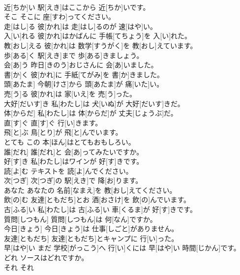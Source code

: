 \documentclass[8pt]{extreport}
\begin{document}
\begin{CJK}{UTF8}{min}
\\	近[ちか]い	駅[えき]はここから 近[ちか]いです。		
\\	そこ	そこに 座[すわ]ってください。		
\\	走[はし]る	彼[かれ]は 走[はし]るのが 速[はや]い。		
\\	入[い]れる	彼[かれ]はかばんに 手帳[てちょう]を 入[い]れた。		
\\	教[おし]える	彼[かれ]は 数学[すうがく]を 教[おし]えています。		
\\	歩[ある]く	駅[えき]まで 歩[ある]きましょう。		
\\	会[あ]う	昨日[きのう]おじさんに 会[あ]いました。		
\\	書[か]く	彼[かれ]に 手紙[てがみ]を 書[か]きました。		
\\	頭[あたま]	今朝[けさ]から 頭[あたま]が 痛[いた]い。		
\\	売[う]る	彼[かれ]は 家[いえ]を 売[う]った。		
\\	大好[だいす]き	私[わたし]は 犬[いぬ]が 大好[だいす]きだ。		
\\	体[からだ]	私[わたし]は 体[からだ]が 丈夫[じょうぶ]だ。		
\\	直[す]ぐ	直[す]ぐ 行[い]きます。		
\\	飛[と]ぶ	鳥[とり]が 飛[と]んでいます。		
\\	とても	この 本[ほん]はとてもおもしろい。		
\\	誰[だれ]	誰[だれ]と 会[あ]ってみたいですか。		
\\	好[す]き	私[わたし]はワインが 好[す]きです。		
\\	読[よ]む	テキストを 読[よ]んでください。		
\\	次[つぎ]	次[つぎ]の 駅[えき]で 降[お]ります。		
\\	あなた	あなたの 名前[なまえ]を 教[おし]えてください。		
\\	飲[の]む	友達[ともだち]とお 酒[おさけ]を 飲[の]んでいます。		
\\	古[ふる]い	私[わたし]は 古[ふる]い 車[くるま]が 好[す]きです。		
\\	質問[しつもん]	質問[しつもん]は 何[なん]ですか。		
\\	今日[きょう]	今日[きょう]は 仕事[しごと]がありません。		
\\	友達[ともだち]	友達[ともだち]とキャンプに 行[い]った。		
\\	早[はや]い	まだ 学校[がっこう]へ 行[い]くには 早[はや]い 時間[じかん]です。		
\\	どれ	ソースはどれですか。		
\\	それ	それ

\end{CJK}
\end{document}
